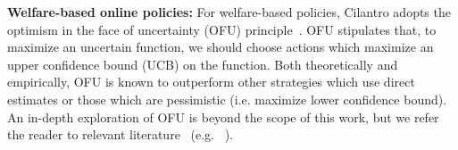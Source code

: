 

\textbf{Welfare-based online policies:}
For welfare-based policies, Cilantro adopts the %
optimism in the face of uncertainty (OFU) principle~\cite{bubeck2012regret}.
OFU stipulates that, to maximize an uncertain function,
 we should choose actions which maximize an upper confidence bound (UCB) on the function.
Both theoretically and empirically,
OFU is known to outperform other strategies which use direct estimates or those which
are pessimistic (i.e. maximize lower confidence bound).
An in-depth exploration of OFU is beyond the scope of
this work, but we refer the reader to relevant literature%
~(e.g. ~\cite{auer2002using,bubeck2010x,snoek2012practical,gotovos2013active}).



